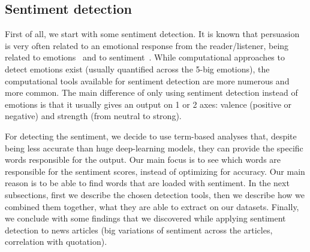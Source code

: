 \subsection{\statusorange Sentiment detection}
\label{ssec:lp_techniques_sentiment}

First of all, we start with some sentiment detection. It is known that persuasion is very often related to an emotional response from the reader/listener, being related to emotions~\citep{rocklage2018persuasion,petty2015emotion,desteno2004discrete} and to sentiment~\citep{gatti2014sentiment}.
While computational approaches to detect emotions exist (usually quantified across the 5-big emotions), the computational tools available for sentiment detection are more numerous and more common. The main difference of only using sentiment detection instead of emotions is that it usually gives an output on 1 or 2 axes: %
valence (positive or negative) and strength (from neutral to strong). %

For detecting the sentiment, we decide to use term-based analyses that, despite being less accurate than huge deep-learning models, %
they can provide the specific words responsible for the output. Our main focus is to see which words are responsible for the sentiment scores, instead of optimizing for accuracy. Our main reason is to be able to find words that are loaded with sentiment. %
In the next subsections, first we describe the chosen detection tools, then we describe how we combined them together, what they are able to extract on our datasets. Finally, we conclude with some findings that we discovered while applying sentiment detection to news articles (big variations of sentiment across the articles, correlation with quotation).

